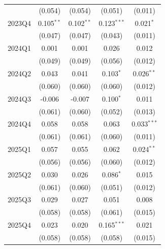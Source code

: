 \begin{table}[htbp]
\begin{tabular}{lcccc}
 & (0.054) & (0.054) & (0.051) & (0.011) \\
2023Q4 & 0.105$^{**}$ & 0.102$^{**}$ & 0.123$^{***}$ & 0.021$^{*}$ \\
 & (0.047) & (0.047) & (0.043) & (0.011) \\
2024Q1 & 0.001 & 0.001 & 0.026 & 0.012 \\
 & (0.049) & (0.049) & (0.056) & (0.012) \\
2024Q2 & 0.043 & 0.041 & 0.103$^{*}$ & 0.026$^{**}$ \\
 & (0.060) & (0.060) & (0.060) & (0.012) \\
2024Q3 & -0.006 & -0.007 & 0.100$^{*}$ & 0.011 \\
 & (0.061) & (0.060) & (0.052) & (0.013) \\
2024Q4 & 0.058 & 0.058 & 0.063 & 0.033$^{***}$ \\
 & (0.061) & (0.061) & (0.060) & (0.011) \\
2025Q1 & 0.057 & 0.055 & 0.062 & 0.024$^{**}$ \\
 & (0.056) & (0.056) & (0.060) & (0.012) \\
2025Q2 & 0.030 & 0.026 & 0.086$^{*}$ & 0.015 \\
 & (0.061) & (0.060) & (0.051) & (0.012) \\
2025Q3 & 0.029 & 0.027 & 0.051 & 0.008 \\
 & (0.058) & (0.058) & (0.061) & (0.015) \\
2025Q4 & 0.023 & 0.020 & 0.165$^{***}$ & 0.021 \\
 & (0.058) & (0.058) & (0.058) & (0.015) \\
\bottomrule
\end{tabular}
\par\vspace{2pt}{\footnotesize Reference quarter 2022Q3 omitted. Standard errors clustered on occupation in parentheses. * p<0.10, ** p<0.05, *** p<0.01.}
\end{table}

